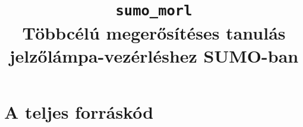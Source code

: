 \documentclass[11pt,a4paper]{article}
\title{\texttt{sumo\_morl}\\[4pt]\large Többcélú megerősítéses tanulás jelzőlámpa-vezérléshez SUMO-ban}
\date{}
\begin{document}
\maketitle
\tableofcontents
\newpage



\newpage
\appendix
\section{A teljes forráskód}

\end{document}
